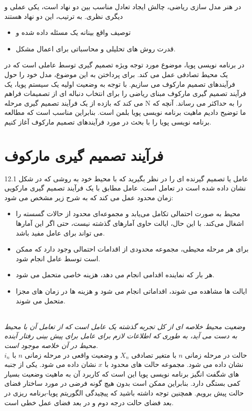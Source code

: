 \documentclass[oneside, 11pt, a4paper]{book}
\begin{document}
در هنر مدل سازی ریاضی، چالش ایجاد تعادل مناسب بین دو نهاد است، یکی عملی و دیگری نظری. به ترتیب، این دو نهاد هستند
\begin{itemize}
    \item توصیف واقع بینانه یک مسئله داده شده و
    \item قدرت روش های تحلیلی و محاسباتی برای اعمال مشکل.
\end{itemize}
در برنامه نویسی پویا، موضوع مورد توجه ویژه تصمیم گیری توسط عاملی است که در یک محیط تصادفی عمل می کند. برای پرداختن به این موضوع، مدل خود را حول فرآیندهای تصمیم مارکوف می سازیم. با توجه به وضعیت اولیه یک سیستم پویا، یک فرآیند تصمیم گیری مارکوف مبنای ریاضی را برای انتخاب دنباله ای از تصمیمات فراهم می کند که بازده از یک فرآیند تصمیم گیری مرحله N را به حداکثر می رساند. آنچه که ما توضیح دادیم ماهیت برنامه نویسی پویا بلمن است. بنابراین مناسب است که مطالعه برنامه نویسی پویا را با بحث در مورد فرآیندهای تصمیم مارکوف آغاز کنیم.



\section{فرآیند تصمیم گیری مارکوف}\label{sec:2}

عامل یا تصمیم گیرنده ای را در نظر بگیرید که با محیط خود به روشی که در شکل 12.1 نشان داده شده است در تعامل است. عامل مطابق با یک فرآیند تصمیم گیری مارکویی زمان محدود عمل می کند که به شرح زیر مشخص می شود:
\begin{itemize}
    \item محیط به صورت احتمالی تکامل می‌یابد و مجموعه‌ای محدود از حالات گسسته را اشغال می‌کند. با این حال، ایالت حاوی آمارهای گذشته نیست، حتی اگر این آمارها می تواند برای عامل مفید باشد.
    \item برای هر مرحله محیطی، مجموعه محدودی از اقدامات احتمالی وجود دارد که ممکن است توسط عامل انجام شود.
    \item هر بار که نماینده اقدامی انجام می دهد، هزینه خاصی متحمل می شود.
    \item ایالت ها مشاهده می شوند، اقداماتی انجام می شود و هزینه ها در زمان های مجزا متحمل می شوند.
\end{itemize}
\\
\indent\emph{\color{blue}وضعیت محیط خلاصه ای از کل تجربه گذشته یک عامل است که از تعامل آن با محیط به دست می آید، به طوری که اطلاعات لازم برای عامل برای پیش بینی رفتار آینده محیط در آن خلاصه موجود است.}\\
حالت در مرحله زمانی $n$ با متغیر تصادفی $X_n$ و وضعیت واقعی در مرحله زمانی $n$ با $i_n$ نشان داده می شود. مجموعه حالت های محدود با $x$ نشان داده می شود. یکی از جنبه های شگفت انگیز برنامه نویسی پویا این است که کاربرد آن به ماهیت وضعیت بسیار کمی بستگی دارد. بنابراین ممکن است بدون هیچ گونه فرضی در مورد ساختار فضای حالت پیش برویم. همچنین توجه داشته باشید که پیچیدگی الگوریتم پویا-برنامه ریزی در بعد فضای حالت درجه دوم و در بعد فضای عمل خطی است.
\end{document}

